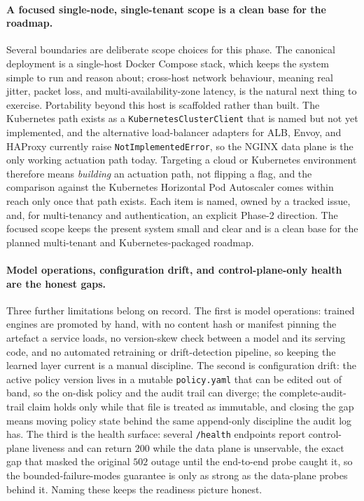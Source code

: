 \paragraph{A focused single-node, single-tenant scope is a clean base for the
roadmap.} Several boundaries are deliberate scope choices for this phase. The canonical
deployment is a single-host Docker Compose stack, which keeps the system simple to run
and reason about; cross-host network behaviour, meaning real jitter, packet loss, and
multi-availability-zone latency, is the natural next thing to exercise. Portability
beyond this host is scaffolded rather than built. The Kubernetes path exists as a
\texttt{KubernetesClusterClient} that is named but not yet implemented, and the
alternative load-balancer adapters for ALB, Envoy, and HAProxy currently raise
\texttt{NotImplementedError}, so the NGINX data plane is the only working actuation path
today. Targeting a cloud or Kubernetes environment therefore means \emph{building} an
actuation path, not flipping a flag, and the comparison against the Kubernetes
Horizontal Pod Autoscaler \cite{k8shpa} comes within reach only once that path exists.
Each item is named, owned by a tracked issue, and, for multi-tenancy and
authentication, an explicit Phase-2 direction. The focused scope keeps the present
system small and clear and is a clean base for the planned multi-tenant and
Kubernetes-packaged roadmap.

\paragraph{Model operations, configuration drift, and control-plane-only health are
the honest gaps.} Three further limitations belong on record. The first is model
operations: trained engines are promoted by hand, with no content hash or manifest
pinning the artefact a service loads, no version-skew check between a model and its
serving code, and no automated retraining or drift-detection pipeline, so keeping the
learned layer current is a manual discipline. The second is configuration drift: the
active policy version lives in a mutable \texttt{policy.yaml} that can be edited out of
band, so the on-disk policy and the audit trail can diverge; the complete-audit-trail
claim holds only while that file is treated as immutable, and closing the gap means
moving policy state behind the same append-only discipline the audit log has. The third
is the health surface: several \texttt{/health} endpoints report control-plane liveness
and can return $200$ while the data plane is unservable, the exact gap that masked the
original $502$ outage until the end-to-end probe caught it, so the bounded-failure-modes
guarantee is only as strong as the data-plane probes behind it. Naming these keeps the
readiness picture honest.

